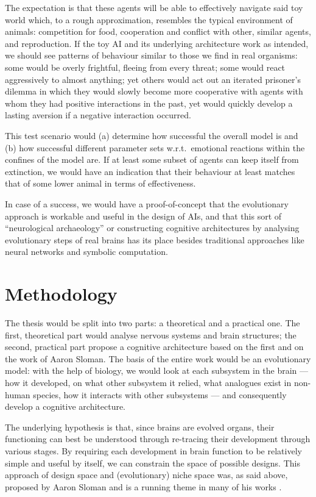 \documentclass[bibliography=totoc ]{scrartcl}
\begin{document}
The expectation is that these agents will be able to effectively navigate said toy world which, to a rough approximation, resembles the typical environment of animals: competition for food, cooperation and conflict with other, similar agents, and reproduction. If the toy AI and its underlying architecture work as intended, we should see patterns of behaviour similar to those we find in real organisms: some would be overly frightful, fleeing from every threat; some would react aggressively to almost anything; yet others would act out an iterated prisoner's dilemma in which they would slowly become more cooperative with agents with whom they had positive interactions in the past, yet would quickly develop a lasting aversion if a negative interaction occurred.

This test scenario would (a) determine how successful the overall model is and (b) how successful different parameter sets w.r.t.\ emotional reactions within the confines of the model are. If at least some subset of agents can keep itself from extinction, we would have an indication that their behaviour at least matches that of some lower animal in terms of effectiveness.

In case of a success, we would have a proof-of-concept that the evolutionary approach is workable and useful in the design of AIs, and that this sort of ``neurological archaeology'' or constructing cognitive architectures by analysing evolutionary steps of real brains has its place besides traditional approaches like neural networks and symbolic computation.

\section{Methodology}

The thesis would be split into two parts: a theoretical and a practical one. The first, theoretical part would analyse nervous systems and brain structures; the second, practical part propose a cognitive architecture based on the first and on the work of Aaron Sloman. The basis of the entire work would be an evolutionary model: with the help of biology, we would look at each subsystem in the brain --- how it developed, on what other subsystem it relied, what analogues exist in non-human species, how it interacts with other subsystems --- and consequently develop a cognitive architecture.

The underlying hypothesis is that, since brains are evolved organs, their functioning can best be understood through re-tracing their development through various stages. By requiring each development in brain function to be relatively simple and useful by itself, we can constrain the space of possible designs. This approach of design space and (evolutionary) niche space was, as said above, proposed by Aaron Sloman \cite{slomanNiche} and is a running theme in many of his works \cite{sloman2000, sloman1993, sloman1997}.
\end{document}

